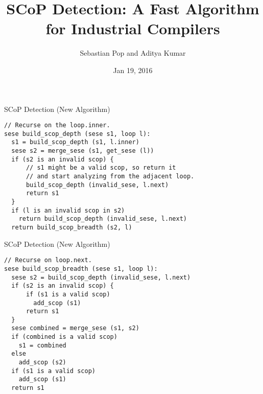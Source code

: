 \documentclass{beamer}
\begin{document}
\def \SCoP {SCoP}
\def \GCC {GCC}
\def \LLVM {LLVM}
\def \SESE {SESE}
\def \CFG {CFG}
\def \SSA {SSA}
\def \scev {scev}

\title{\SCoP{} Detection: A Fast Algorithm for Industrial Compilers}
\author{Sebastian Pop and Aditya Kumar}
\date{Jan 19, 2016}

\frame{\titlepage}




\begin{frame}[fragile]{SCoP Detection (New Algorithm)}
\begin{verbatim}
// Recurse on the loop.inner.
sese build_scop_depth (sese s1, loop l):
  s1 = build_scop_depth (s1, l.inner)
  sese s2 = merge_sese (s1, get_sese (l))
  if (s2 is an invalid scop) {
      // s1 might be a valid scop, so return it
      // and start analyzing from the adjacent loop.
      build_scop_depth (invalid_sese, l.next)
      return s1
  }
  if (l is an invalid scop in s2)
    return build_scop_depth (invalid_sese, l.next)
  return build_scop_breadth (s2, l)
\end{verbatim}
\end{frame}

\begin{frame}[fragile]{SCoP Detection (New Algorithm)}
\begin{verbatim}
// Recurse on loop.next.
sese build_scop_breadth (sese s1, loop l):
  sese s2 = build_scop_depth (invalid_sese, l.next)
  if (s2 is an invalid scop) {
      if (s1 is a valid scop)
        add_scop (s1)
      return s1
  }
  sese combined = merge_sese (s1, s2)
  if (combined is a valid scop)
    s1 = combined
  else
    add_scop (s2)
  if (s1 is a valid scop)
    add_scop (s1)
  return s1
\end{verbatim}
\end{frame}
\end{document}
